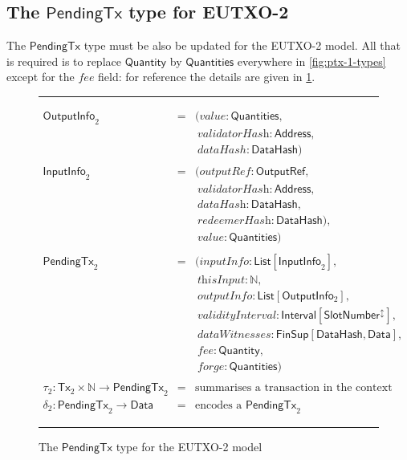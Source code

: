 \documentclass[a4paper]{article}
\renewcommand{\i}{\textit}  %
\newcommand{\s}{\textsf}  %
\newcommand{\msf}[1]{\ensuremath{\mathsf{#1}}}
\newcommand{\mi}[1]{\ensuremath{\mathit{#1}}}
\newcommand\rfskip{7pt}
\newenvironment{ruledfigure}[1]{\begin{figure}[#1]\hrule\vspace{\rfskip}}{\vspace{\rfskip}\hrule\end{figure}}
\newcommand{\List}[1]{\ensuremath{\s{List}[#1]}}
\newcommand{\Interval}[1]{\ensuremath{\s{Interval}[#1]}}
\newcommand{\extended}[1]{#1^\updownarrow}
\newcommand{\FinSup}[2]{\ensuremath{\s{FinSup}[#1,#2]}}
\newcommand{\ptx}{\ensuremath{\s{PendingTx}}}
\newcommand{\Address}{\ensuremath{\s{Address}}}
\newcommand{\DataHash}{\ensuremath{\s{DataHash}}}
\newcommand{\forge}{\mi{forge}}
\newcommand{\fee}{\mi{fee}}
\newcommand{\val}{\mi{value}}  %
\newcommand{\dataHsh}{\mi{dataHash}}
\newcommand{\dataWits}{\mi{dataWitnesses}}
\newcommand{\Data}{\ensuremath{\s{Data}}}
\newcommand{\outputref}{\mi{outputRef}}
\newcommand{\slotnum}{\ensuremath{\s{SlotNumber}}}
\newcommand{\eutxotx}{\msf{Tx}}
\newcommand{\qty}{\ensuremath{\s{Quantity}}}
\newcommand{\qtymap}{\ensuremath{\s{Quantities}}}
\newcommand\N{\ensuremath{\mathbb{N}}}
\begin{document}
\subsection{The \ptx{} type for EUTXO-2}
\label{sec:pendingtx-2}
The \ptx{} type must be also be updated for the EUTXO-2 model.  All
that is required is to replace \qty{} by \qtymap{} everywhere in
\cref{fig:ptx-1-types} except for the \fee{} field: for reference
the details are given in \cref{fig:ptx-2-types}.
\begin{ruledfigure}{H}
  \begin{displaymath}
  \begin{array}{rll}
    \s{OutputInfo}_2\s{ } &=&(\val: \qtymap,\\
                          & &\ \i{validatorHash}: \Address,\\
                          & &\ \dataHsh: \DataHash)\\
    \\
    \s{InputInfo}_2\s{ } &=& (\outputref: \s{OutputRef},\\
                         & &\ \i{validatorHash}: \Address,\\
                         & &\ \i{dataHash}: \DataHash,\\
                         & &\ \i{redeemerHash}: \DataHash),\\
                         & &\ \val: \qtymap)\\
     \\
     \ptx_2\s{ } &=&(\i{inputInfo}: \List{\s{InputInfo}_2},\\
                 & &\ \i{thisInput}: \N,\\
                 & &\ \i{outputInfo}: \List{\s{OutputInfo$_2$}},\\
                 & &\ \i{validityInterval}: \Interval{\extended{\slotnum}},\\
                 & &\ \dataWits: \FinSup{\DataHash}{\Data},\\
                 & &\ \fee: \qty,\\
                 & &\ \forge: \qtymap)\\
    \\
    \tau_2: \eutxotx_2 \times \N \rightarrow \ptx_2 &=& \mbox{summarises a transaction in the context of an input}\\
    \delta_2: \ptx_2 \rightarrow \Data &=& \mbox{encodes a $\ptx_2$}
  \end{array}
  \end{displaymath}
  \caption{The \ptx{} type for the EUTXO-2 model}
  \label{fig:ptx-2-types}
\end{ruledfigure}
\end{document}
